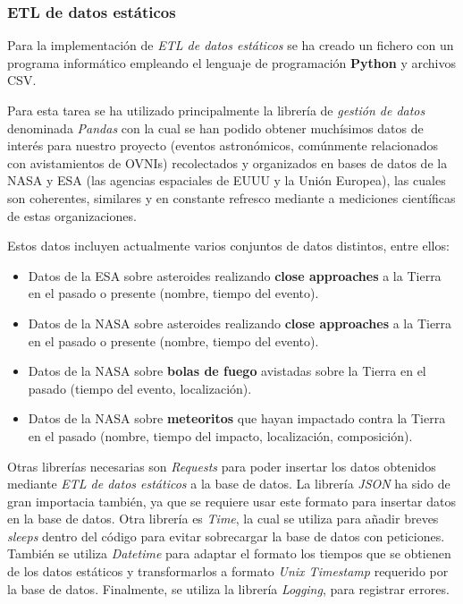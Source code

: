 \subsubsection{ETL de datos estáticos}

Para la implementación de \textit{ETL de datos estáticos} se ha creado un fichero con un programa informático empleando el lenguaje de programación \textbf{Python} y archivos CSV. 

Para esta tarea se ha utilizado principalmente la librería de \textit{gestión de datos} denominada \textit{Pandas} 
con la cual se han podido obtener muchísimos datos de interés para nuestro proyecto (eventos astronómicos, comúnmente relacionados con avistamientos de OVNIs) 
recolectados y organizados en bases de datos de la NASA y ESA (las agencias espaciales de EUUU y la Unión Europea), 
las cuales son coherentes, similares y en constante refresco mediante a mediciones científicas de estas organizaciones.

Estos datos incluyen actualmente varios conjuntos de datos distintos, entre ellos: 

\begin{itemize}
    \item Datos de la ESA sobre asteroides realizando \textbf{close approaches} a la Tierra en el pasado o presente (nombre, tiempo del evento). \cite{esa-neo-db}
    \item Datos de la NASA sobre asteroides realizando \textbf{close approaches} a la Tierra en el pasado o presente (nombre, tiempo del evento). \cite{nasa-cneos-db}
    \item Datos de la NASA sobre \textbf{bolas de fuego} avistadas sobre la Tierra en el pasado (tiempo del evento, localización). \cite{nasa-fireballs-db}
    \item Datos de la NASA sobre \textbf{meteoritos} que hayan impactado contra la Tierra en el pasado (nombre, tiempo del impacto, localización, composición). \cite{nasa-meteorite-db}
\end{itemize}


Otras librerías necesarias son \textit{Requests} para poder insertar los datos obtenidos mediante \textit{ETL de datos estáticos} a la base de datos. 
La librería \textit{JSON} ha sido de gran importacia también, ya que se requiere usar este formato para insertar datos en la base de datos. 
Otra librería es \textit{Time}, la cual se utiliza para añadir breves \textit{sleeps} dentro del código para evitar sobrecargar la base de datos con peticiones. 
También se utiliza \textit{Datetime} para adaptar el formato los tiempos que se obtienen de los datos estáticos y transformarlos a formato \textit{Unix Timestamp} requerido por la base de datos. 
Finalmente, se utiliza la librería \textit{Logging}, para registrar errores.

